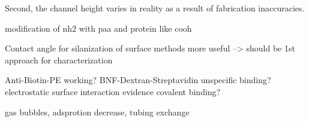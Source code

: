 Second, the channel height varies in reality as a result of fabrication inaccuracies. 

modification of nh2 with paa and protein like cooh

Contact angle for silanization of surface methods more useful --> should be 1st approach for characterization

Anti-Biotin-PE working?
BNF-Dextran-Streptavidin unspecific binding?
electrostatic surface interaction
evidence covalent binding?

gas bubbles, adsprotion decrease, tubing exchange